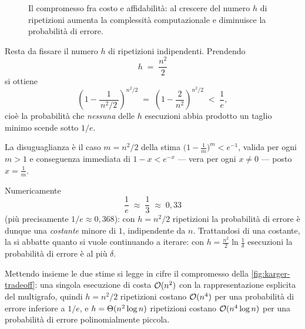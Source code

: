 \begin{figure}[H]
  \centering
  
  \caption{Il compromesso fra costo e affidabilità: al crescere del numero $h$ di ripetizioni
  aumenta la complessità computazionale e diminuisce la probabilità di errore.}
  \label{fig:karger-tradeoff}
\end{figure}

Resta da fissare il numero $h$ di ripetizioni indipendenti. Prendendo
\[
  h \;=\; \frac{n^{2}}{2}
\]
si ottiene
\[
  \left(1-\frac{1}{\,n^{2}/2\,}\right)^{\!n^{2}/2}
  \;=\;\left(1-\frac{2}{n^{2}}\right)^{\!n^{2}/2}
  \;<\;\frac{1}{e},
\]
cioè la probabilità che \emph{nessuna} delle $h$ esecuzioni abbia prodotto un taglio minimo
scende sotto $1/e$.

\begin{osservazione}
La disuguaglianza è il caso $m=n^{2}/2$ della stima
$\bigl(1-\tfrac{1}{m}\bigr)^{m}<e^{-1}$, valida per ogni $m>1$ e conseguenza immediata di
$1-x<e^{-x}$ — vera per ogni $x\neq 0$ — posto $x=\tfrac{1}{m}$.
\end{osservazione}

Numericamente
\[
  \frac{1}{e}\;\approx\;\frac{1}{3}\;\approx\;0{,}33
\]
(più precisamente $1/e\approx 0{,}368$): con $h=n^{2}/2$ ripetizioni la probabilità di errore
è dunque una \emph{costante} minore di $1$, indipendente da $n$. Trattandosi di una costante,
la si abbatte quanto si vuole continuando a iterare: con
$h=\frac{n^{2}}{2}\ln\frac{1}{\delta}$ esecuzioni la probabilità di errore è al più $\delta$.

\begin{osservazione}
Mettendo insieme le due stime si legge in cifre il compromesso della
\autoref{fig:karger-tradeoff}: una singola esecuzione di \contract costa $\mathcal{O}(n^{2})$ con la
rappresentazione esplicita del multigrafo, quindi $h=n^{2}/2$ ripetizioni costano
$\mathcal{O}(n^{4})$ per una probabilità di errore inferiore a $1/e$, e
$h=\Theta(n^{2}\log n)$ ripetizioni costano $\mathcal{O}(n^{4}\log n)$ per una probabilità di errore
polinomialmente piccola.
\end{osservazione}
